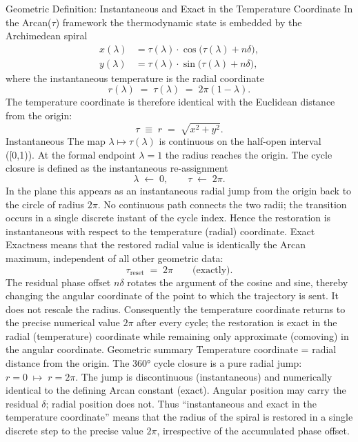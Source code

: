 Geometric Definition: Instantaneous and Exact in the Temperature Coordinate
In the Arcan(\(\tau\)) framework the thermodynamic state is embedded by the Archimedean spiral
\[
\begin{align*}
x(\lambda) &= \tau(\lambda)\cdot\cos\bigl(\tau(\lambda)+n\delta\bigr),\\
y(\lambda) &= \tau(\lambda)\cdot\sin\bigl(\tau(\lambda)+n\delta\bigr),
\end{align*}
\]
where the instantaneous temperature is the radial coordinate
\[
r(\lambda)\;=\;\tau(\lambda)\;=\;2\pi(1-\lambda).
\]
The temperature coordinate is therefore identical with the Euclidean distance from the origin:
\[
\tau\;\equiv\;r\;=\;\sqrt{x^{2}+y^{2}}.
\]
Instantaneous
The map \(\lambda\mapsto\tau(\lambda)\) is continuous on the half-open interval ([0,1)). At the formal endpoint \(\lambda=1\) the radius reaches the origin. The cycle closure is defined as the instantaneous re-assignment
\[
\lambda\;\leftarrow\;0,\qquad
\tau\;\leftarrow\;2\pi.
\]
In the plane this appears as an instantaneous radial jump from the origin back to the circle of radius \(2\pi\). No continuous path connects the two radii; the transition occurs in a single discrete instant of the cycle index. Hence the restoration is instantaneous with respect to the temperature (radial) coordinate.
Exact
Exactness means that the restored radial value is identically the Arcan maximum, independent of all other geometric data:
\[
\tau_{\text{reset}}\;=\;2\pi
\qquad\text{(exactly)}.
\]
The residual phase offset \(n\delta\) rotates the argument of the cosine and sine, thereby changing the angular coordinate of the point to which the trajectory is sent. It does not rescale the radius. Consequently the temperature coordinate returns to the precise numerical value \(2\pi\) after every cycle; the restoration is exact in the radial (temperature) coordinate while remaining only approximate (comoving) in the angular coordinate.
Geometric summary
Temperature coordinate = radial distance from the origin.  
The 360° cycle closure is a pure radial jump: \(r=0\;\mapsto\;r=2\pi\).  
The jump is discontinuous (instantaneous) and numerically identical to the defining Arcan constant (exact).  
Angular position may carry the residual \(\delta\); radial position does not.
Thus “instantaneous and exact in the temperature coordinate” means that the radius of the spiral is restored in a single discrete step to the precise value \(2\pi\), irrespective of the accumulated phase offset.

